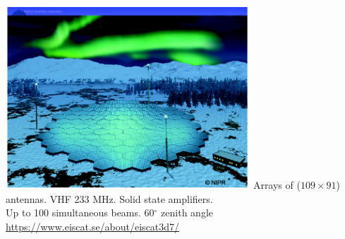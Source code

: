 \begin{frame}[fragile,t]
\frametitle{\hfill}
\vspace{0.1in}
\begin{center}
\includegraphics[height=2.7in]{eiscat_3d_array.png}
\vfill
    {\colblack Arrays of ($109 \times 91$) antennas. VHF 233 MHz. Solid state amplifiers.\\Up to 100 simultaneous beams. 60$^\circ$ zenith angle}
    {\colblack \small \url{https://www.eiscat.se/about/eiscat3d7/}}
\end{center}
\end{frame}

